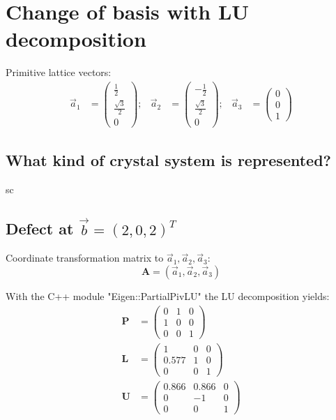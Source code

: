 \section{Change of basis with LU decomposition}

Primitive lattice vectors:
\begin{align}
    \vec{a}_1 &= 
    \begin{pmatrix}
        \frac{1}{2} \\[2pt] \frac{\sqrt{3}}{2} \\[2pt] 0
    \end{pmatrix};
    &
    \vec{a}_2 &=
    \begin{pmatrix}
        -\frac{1}{2} \\[2pt] \frac{\sqrt{3}}{2} \\[2pt] 0
    \end{pmatrix};
    &
    \vec{a}_3 &=
    \begin{pmatrix}
        0 \\
        0 \\
        1
    \end{pmatrix}
\end{align}

\renewcommand\thesubsection{\thesection.\alph{subsection})}

\subsection{What kind of crystal system is represented?}

sc

\subsection{Defect at $\vec{b} = (2,0,2)^T$}

Coordinate transformation matrix to ${\vec{a}_1,\vec{a}_2,\vec{a}_3}$:
\begin{equation}
    \symbf{A} = (\vec{a}_1,\vec{a}_2,\vec{a}_3)
\end{equation}

With the C++ module "Eigen::PartialPivLU" the LU decomposition yields:
\begin{align}
    \symbf{P} &= 
    \begin{pmatrix}
        0 & 1 & 0 \\
        1 & 0 & 0 \\
        0 & 0 & 1 
    \end{pmatrix} \\
    \symbf{L} &= 
    \begin{pmatrix}
        1 & 0 & 0 \\
        0.577 & 1 & 0 \\
        0 & 0 & 1 
    \end{pmatrix} \\
    \symbf{U} &= 
    \begin{pmatrix}
        0.866 & 0.866 & 0 \\
        0 & -1 & 0 \\
        0 & 0 & 1 
    \end{pmatrix}
\end{align}

